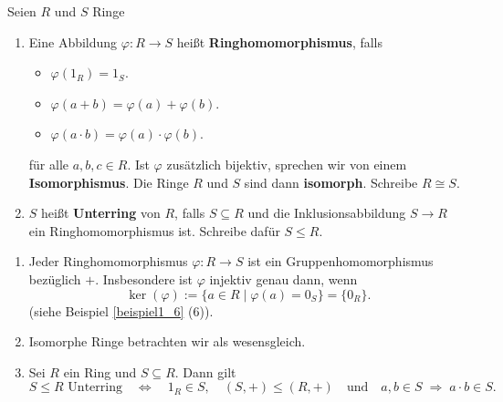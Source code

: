 \begin{definition}
	Seien $R$ und $S$ Ringe 
	\begin{enumerate}[label=(\alph*)]
		\item Eine Abbildung $\varphi \colon R \to S$ heißt \textbf{Ringhomomorphismus}, falls 
		\begin{itemize}
			\item $\varphi(1_R) = 1_S$.
			\item $\varphi(a+ b) = \varphi(a) + \varphi(b)$.
			\item $\varphi(a\cdot b) = \varphi(a) \cdot \varphi(b)$.
		\end{itemize}
		für alle $a,b,c \in R$. Ist $\varphi$ zusätzlich bijektiv, sprechen wir von einem \textbf{Isomorphismus}. Die Ringe $R$ und $S$ sind dann \textbf{isomorph}. Schreibe $R \cong S$.
		\item $S$ heißt \textbf{Unterring} von $R$, falls $S \subseteq R$ und die Inklusionsabbildung $S \to R$ ein Ringhomomorphismus ist. Schreibe dafür $S \leq R$.
	\end{enumerate}
\end{definition}
\begin{rem}\label{rem4_5}
	\begin{enumerate}[label=(\roman*)]
		\item Jeder Ringhomomorphismus $\varphi \colon R \to S$ ist ein Gruppenhomomorphismus bezüglich $+$. Insbesondere ist $\varphi$ injektiv genau dann, wenn
		\[\ker(\varphi) := \{a \in R \mid \varphi(a) = 0_S\} = \{0_R\}.\]
		(siehe Beispiel \ref{beispiel1_6} (6)).
		\item Isomorphe Ringe betrachten wir als wesensgleich.
		\item Sei $R$ ein Ring und $S \subseteq R$. Dann gilt 
		\[S \leq R \text{ Unterring} \quad\Leftrightarrow\quad 1_R \in S, \quad(S, +) \leq (R,+) \quad\text{und}\quad a,b \in S \;\Rightarrow\; a\cdot b \in S.\]
	\end{enumerate}
\end{rem}
